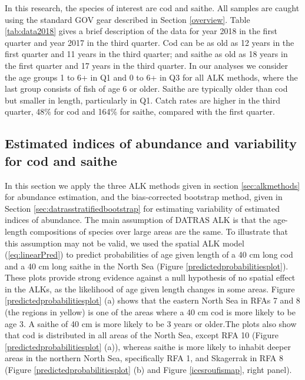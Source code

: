 \documentclass[a4paper 12pt]{article}
\numberwithin{equation}{section}
\begin{document}
In this research, the species of interest are cod and saithe. All samples are caught using the standard GOV gear described in Section \ref{overview}. Table \ref{tab:data2018} gives a brief description of the data for year 2018 in the first quarter and year 2017 in the third quarter.  Cod can be as old as 12 years in the first quarter and 11 years in the third quarter; and saithe as old as 18 years in the first quarter and 17 years in the third quarter. In our analyses we consider the age groups 1 to 6+ in Q1 and 0 to 6+ in Q3 for all ALK methods, where the last group consists of fish of age 6 or older. Saithe are typically older than cod but smaller in length, particularly in Q1. Catch rates are higher in the third quarter, 48\% for cod and 164\% for saithe, compared with the first quarter.

\subsection{Estimated indices of abundance and variability for cod and saithe}
\label{sec:codresults}
In this section we apply the three ALK methods given in section \ref{sec:alkmethods} for abundance estimation, and the bias-corrected bootstrap method, given in Section \ref{sec:datrasstratifiedbootstrap} for estimating variability of estimated indices of abundance. The main assumption of DATRAS ALK is that the age-length compositions of species over large areas are the same. To illustrate that this assumption may not be valid, we used  the spatial ALK model (\ref{eq:linearPred}) to predict probabilities of age given length of a 40 cm long cod and a 40 cm long saithe in the North Sea (Figure \ref{predictedprobabilitiesplot}). These plots provide strong evidence against a null hypothesis of no spatial effect in the ALKs, as the likelihood of age given length changes in some areas. Figure \ref{predictedprobabilitiesplot} (a) shows that the eastern North Sea in RFAs 7 and 8 (the regions in yellow) is one of the areas where a 40 cm cod is more likely to be age 3. A saithe of 40 cm is more likely to be 3 years or older.The plots also show that cod is distributed in all areas of the North Sea, except RFA 10 (Figure \ref{predictedprobabilitiesplot} (a)), whereas saithe is more likely to inhabit deeper areas in the northern North Sea, specifically RFA 1, and Skagerrak in  RFA 8 (Figure \ref{predictedprobabilitiesplot} (b) and Figure \ref{icesroufismap}, right panel). 
\end{document}
